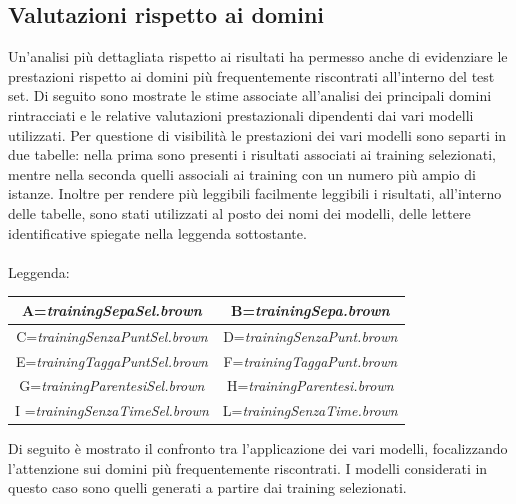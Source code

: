 \documentclass[a4paper]{report}
\begin{document}
\subsection{Valutazioni rispetto ai domini}
Un'analisi più dettagliata rispetto ai risultati ha permesso anche di evidenziare le prestazioni rispetto ai domini più frequentemente riscontrati all'interno del test set. Di seguito sono mostrate le stime associate all'analisi dei principali domini rintracciati e le relative valutazioni prestazionali dipendenti dai vari modelli utilizzati. Per questione di visibilità le prestazioni dei vari modelli sono separti in due tabelle: nella prima sono presenti i risultati associati ai training selezionati, mentre nella seconda quelli associali ai training con un numero più ampio di istanze. Inoltre per rendere più leggibili facilmente leggibili i risultati, all'interno delle tabelle, sono stati utilizzati al posto dei nomi dei modelli, delle lettere identificative spiegate nella leggenda sottostante.\\ \\ 
Leggenda:
\begin{center}
\begin{tabular}{cc}
\hline
A=\textit{trainingSepaSel.brown} & B=\textit{trainingSepa.brown}\\
\hline
C=\textit{trainingSenzaPuntSel.brown} & D=\textit{trainingSenzaPunt.brown} \\
\hline
E=\textit{trainingTaggaPuntSel.brown} & F=\textit{trainingTaggaPunt.brown}\\
\hline
G=\textit{trainingParentesiSel.brown} & H=\textit{trainingParentesi.brown} \\
\hline
I =\textit{trainingSenzaTimeSel.brown} & L=\textit{trainingSenzaTime.brown} \\
\hline
\end{tabular}
\end{center}
Di seguito è mostrato il confronto tra l'applicazione dei vari modelli, focalizzando l'attenzione sui domini più frequentemente riscontrati. I modelli considerati in questo caso sono quelli generati a partire dai training selezionati.
\end{document}
